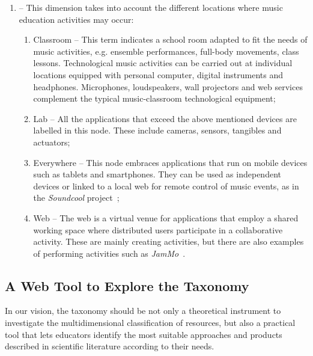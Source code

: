 \documentclass[journal]{IEEEtran}
\newcommand{\dimension}[1]{{\fontfamily{cmss}\selectfont {\textit{#1}}}}
\newcommand{\node}[1]{{\fontfamily{cmss}\selectfont #1}}
\begin{document}
\begin{enumerate}[label=3.\arabic*.,leftmargin=0.7cm,listparindent=-\leftmargin, start=0]
\item \dimension{Venues} -- This dimension takes into account the different locations where music education activities may occur:

\begin{enumerate}[label=3.2.\arabic*.,leftmargin=0.9cm,listparindent=-\leftmargin, start=0]

\item \node{Classroom} -- This term indicates a school room adapted to fit the needs of music activities, e.g. ensemble performances, full-body movements, class lessons. Technological music activities can be carried out at individual locations equipped with personal computer, digital instruments and headphones. Microphones, loudspeakers, wall projectors and web services complement the typical music-classroom technological equipment;

\item \node{Lab} -- All the applications that exceed the above mentioned devices are labelled in this node. These include cameras, sensors, tangibles and actuators;

\item \node{Everywhere} -- This node embraces applications that run on mobile devices such as tablets and smartphones. They can be used as independent devices or linked to a local web for remote control of music events, as in the \textit{Soundcool} project~\cite{roble};

\item \node{Web} -- The web is a virtual venue for applications that employ a shared working space where distributed users participate in a collaborative activity. These are mainly creating activities, but there are also examples of performing activities such as \textit{JamMo}~\cite{paananen2009jammo}.

\end{enumerate}

\end{enumerate}


\subsection{A Web Tool to Explore the Taxonomy}
\label{subsec:exploring}

In our vision, the taxonomy should be not only a theoretical instrument to investigate the multidimensional classification of resources, but also a practical tool that lets educators identify the most suitable approaches and products described in scientific literature according to their needs.
\end{document}

